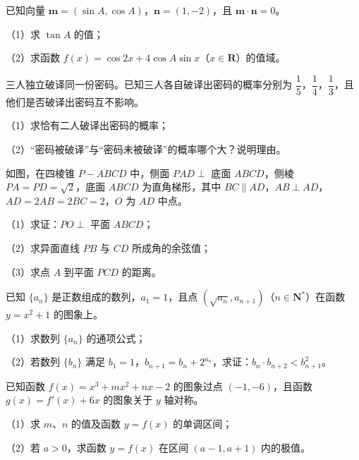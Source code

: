 \begin{question}
已知向量 $\boldsymbol m=(\sin A,\cos A)$，$\boldsymbol n=(1,-2)$，且 $\boldsymbol m\cdot\boldsymbol n=0$。

（1）求 $\tan A$ 的值；

（2）求函数 $f(x)=\cos 2x+4\cos A\sin x$（$x\in\mathbf R$）的值域。

\end{question}
\begin{question}
三人独立破译同一份密码。已知三人各自破译出密码的概率分别为 $\dfrac15$，$\dfrac14$，$\dfrac13$，且他们是否破译出密码互不影响。

（1）求恰有二人破译出密码的概率；

（2）“密码被破译”与“密码未被破译”的概率哪个大？说明理由。

\Needspace{0.4\textheight}
\end{question}
\begin{question}
如图，在四棱锥 $P-ABCD$ 中，侧面 $PAD\perp$ 底面 $ABCD$，侧棱 $PA=PD=\sqrt2$，底面 $ABCD$ 为直角梯形，其中 $BC\parallel AD$，$AB\perp AD$，$AD=2AB=2BC=2$，$O$ 为 $AD$ 中点。

（1）求证：$PO\perp$ 平面 $ABCD$；

（2）求异面直线 $PB$ 与 $CD$ 所成角的余弦值；

（3）求点 $A$ 到平面 $PCD$ 的距离。
\nopagebreak[4]
\begin{center}\end{center}
\nopagebreak[4]
\end{question}
\begin{question}
已知 $\{a_n\}$ 是正数组成的数列，$a_1=1$，且点 $(\sqrt{a_n},a_{n+1})$（$n\in\mathbf N^*$）在函数 $y=x^2+1$ 的图象上。

（1）求数列 $\{a_n\}$ 的通项公式；

（2）若数列 $\{b_n\}$ 满足 $b_1=1$，$b_{n+1}=b_n+2^{a_n}$，求证：$b_n\cdot b_{n+2}<b_{n+1}^2$。

\end{question}
\begin{question}
已知函数 $f(x)=x^3+mx^2+nx-2$ 的图象过点 $(-1,-6)$，且函数 $g(x)=f'(x)+6x$ 的图象关于 $y$ 轴对称。

（1）求 $m$、$n$ 的值及函数 $y=f(x)$ 的单调区间；

（2）若 $a>0$，求函数 $y=f(x)$ 在区间 $(a-1,a+1)$ 内的极值。

\Needspace{0.4\textheight}
\end{question}
